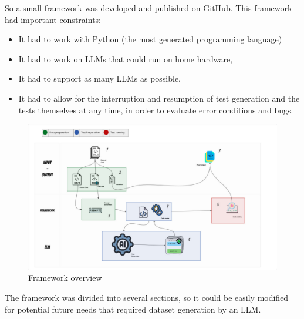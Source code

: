 So a small framework was developed and published on
\href{https://github.com/DelGaudioNunzioSE/Code-LLMsTester.git}{GitHub}.
This framework had important constraints: 
\begin{itemize}
    \item It had to work with Python (the most generated programming language)
    \item It had to work on LLMs that could run on home hardware, 
    \item It had to support as many LLMs as possible, 
    \item It had to allow for the interruption and resumption 
of test generation and the tests themselves at any time, 
in order to evaluate error conditions and bugs.
\end{itemize}

\begin{figure}[H]
    \centering
    \includegraphics[width=1\textwidth]{img/framework/overview.pdf}
    \caption{Framework overview}
    \label{fig:framework overview}
\end{figure}


The framework was divided into several sections, so it could be easily modified for 
potential future needs that required dataset generation by an LLM.

